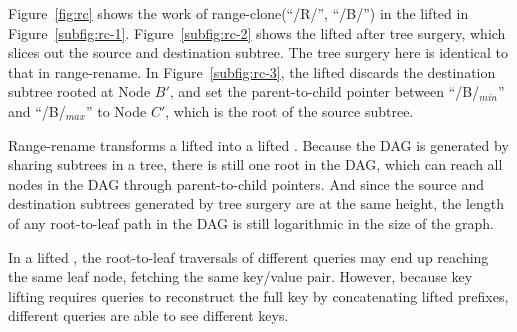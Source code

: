 Figure~\ref{fig:rc} shows the work of range-clone(``/R/'', ``/B/'') in the
lifted \bet in Figure~\ref{subfig:rc-1}.
Figure~\ref{subfig:rc-2} shows the lifted \bet after tree surgery, which slices
out the source and destination subtree.
The tree surgery here is identical to that in range-rename.
In Figure~\ref{subfig:rc-3}, the lifted \bet discards the destination subtree
rooted at Node $B'$, and set the parent-to-child pointer between ``/B/$_{min}$''
and ``/B/$_{max}$'' to Node $C'$, which is the root of the source subtree.

Range-rename transforms a lifted \bet into a lifted \bedag.
Because the DAG is generated by sharing subtrees in a tree,
there is still one root in the DAG,
which can reach all nodes in the DAG through parent-to-child pointers.
And since the source and destination subtrees generated by tree surgery are at
the same height, the length of any root-to-leaf path in the DAG is still
logarithmic in the size of the graph.

In a lifted \bedag, the root-to-leaf traversals of different queries may end up
reaching the same leaf node, fetching the same key/value pair.
However, because key lifting requires queries to reconstruct the full key by
concatenating lifted prefixes, different queries are able to see different keys.

